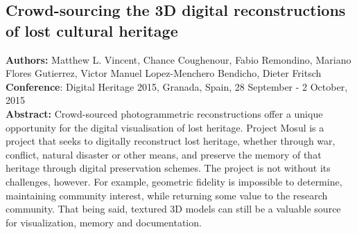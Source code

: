\subsection{Crowd-sourcing the 3D digital reconstructions of lost cultural heritage}

\textbf{Authors:} Matthew L. Vincent,  Chance Coughenour,  Fabio Remondino,  Mariano Flores Gutierrez,  Victor Manuel Lopez-Menchero Bendicho,  Dieter Fritsch
\\
\textbf{Conference}: Digital Heritage 2015, Granada, Spain, 28 September - 2 October, 2015
\\
\textbf{Abstract:} Crowd-sourced photogrammetric reconstructions offer a unique opportunity for the digital visualisation of lost heritage. Project Mosul is a project that seeks to digitally reconstruct lost heritage, whether through war, conflict, natural disaster or other means, and preserve the memory of that heritage through digital preservation schemes. The project is not without its challenges, however. For example, geometric fidelity is impossible to determine, maintaining community interest, while returning some value to the research community. That being said, textured 3D models can still be a valuable source for visualization, memory and documentation.

